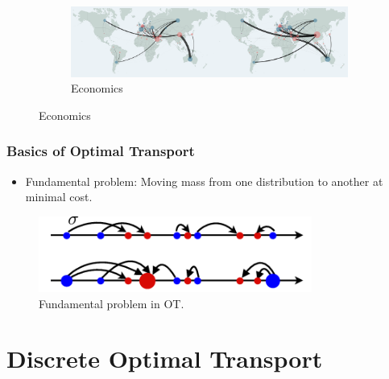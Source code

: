 \documentclass{beamer}
\begin{document}
\begin{frame}
\begin{figure}
			\begin{subfigure}{0.8\textwidth}
				\centering
				\includegraphics[width=\textwidth]{economics.png}
				\caption{Economics \cite{gaskin2024modelling}}
			\end{subfigure}
		\end{figure}
	\end{frame}
	
	\begin{frame}
		\frametitle{Basics of Optimal Transport}
		\begin{itemize}
			\item Fundamental problem: Moving mass from one distribution to another at minimal cost.
		\end{itemize}
		\begin{figure}
			\includegraphics[width=0.8\textwidth]{fundamental_problem.png}
			\caption{Fundamental problem in OT. \cite{peyre2019computational}}
		\end{figure}
	\end{frame}
	
	\section{Discrete Optimal Transport}
	
\end{document}
